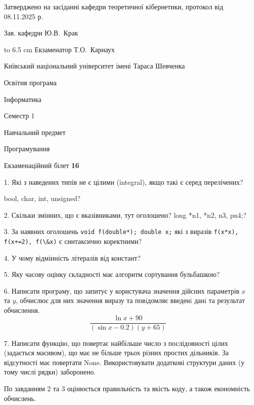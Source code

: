 \documentclass[12pt, ukrainian]{article}
\def\code#1{\Verb!#1!}
\begin{document}
{\smallskip\smallskip \begin {scriptsize} Затверджено на засіданні кафедри теоретичної кібернетики, протокол   від   08.11.2025 р.\par\smallskip\smallskip\smallskip\smallskip
{\parbox {6.5 cm} {Зав. кафедри \dotfill Ю.В.~Крак}}\hspace {0.7cm} {\hbox to 6.5 cm { Екзаменатор \dotfill Т.О.~Карнаух}} \end{scriptsize}}
\vspace{0.9cm}
{{\begin {scriptsize}\par
{ \center  Київський національний університет імені Тараса Шевченка \par}
{\parbox {5 cm}{Освітня програма \hfill}{\parbox {7 cm}{Інформатика\hfill}}\parbox {6 cm}{\hfill Семестр 1}}\par
{\parbox {5 cm} {Навчальний предмет \hfill}\parbox {7 cm}{Програмування \hfill}\parbox {6cm}{\hfill}\par}\vspace{-15pt} \end{scriptsize}}{\center Екзаменаційний білет \No \textbf { 16 }\par}}
{%
1. Які з наведених типів не є цілими (integral), якщо такі є серед перелічених?

bool, char, int, unsigned?
\par
\vspace{2mm}
2. Скільки змінних, що є вказівниками, тут оголошено?
long *n1, *n2, n3, pn4;?
\par
\vspace{2mm}
3. За наявних оголошень \code{void f(double*); double x;} які з виразів \code{f(x*x), f(x+=2), f(\&x)} є синтаксично коректними?
\par
\vspace{2mm}
4. У чому відмінність літералів від констант?
\par
\vspace{2mm}
5. Яку часову оцінку складності має алгоритм сортування бульбашкою?
\par
\vspace{2mm}
6. Написати програму, що запитує у користувача значення дійсних параметрів $x$ та $y$, обчислює для них значення виразу та повiдомляє введенi данi та результат обчислення.
$$\frac{\ln x + 90}{(\sin x - 0.2) (y + 65)}$$ 

\par
7. Написати функцію, що повертає найбільше число з послідовності цілих (задається масивом), що має не більше трьох різних простих дільників. За відсутності має повертати None. Використовувати додаткові структури даних (у тому числі рядки) заборонено.

По завданням 2 та 3 оцінюється правильність та якість коду, а також економність обчислень.

}
\end{document}
